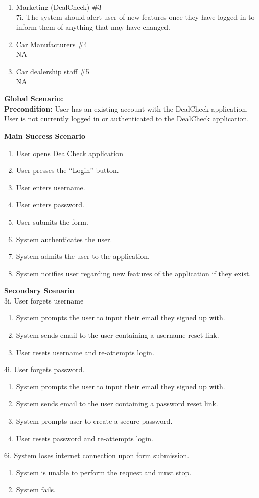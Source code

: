\documentclass[]{article}
\begin{document}
\begin{enumerate}
\begin{enumerate}[{\bf {BE}1.}]
\begin{enumerate}[{\bf VP1.}]
		\item Marketing (DealCheck) \#3 \\
			7i. The system should alert user of new features once they have logged in to inform them of anything that may have changed.
		\item Car Manufacturers \#4 \\
			NA
		\item Car dealership staff \#5 \\
			NA
	\end{enumerate}
	{\bf Global Scenario:}\\
	{\bf Precondition:} User has an existing account with the DealCheck application. User is not currently logged in or authenticated to the DealCheck application.

	{\bf Main Success Scenario}
		\begin{enumerate}[1.]
			\item User opens DealCheck application
			\item User presses the “Login” button.
			\item User enters username.
			\item User enters password.
			\item User submits the form.
			\item System authenticates the user.
			\item System admits the user to the application.
			\item System notifies user regarding new features of the application if they exist.
		\end{enumerate}
		{\bf Secondary Scenario} \\
		3i. User forgets username
		\begin{enumerate}[{3i}.1]
			\item System prompts the user to input their email they signed up with.
			\item System sends email to the user containing a username reset link.
			\item User resets username and re-attempts login.
		\end{enumerate}
		4i. User forgets password.
		\begin{enumerate}[{4i}.1]
			\item System prompts the user to input their email they signed up with.
			\item System sends email to the user containing a password reset link.
			\item System prompts user to create a secure password.
			\item User resets password and re-attempts login.
		\end{enumerate}
		6i. System loses internet connection upon form submission.
		\begin{enumerate}[{6i}.1]
			\item System is unable to perform the request and must stop.
			\item System fails.
		\end{enumerate}
\end{enumerate}


\end{enumerate}
\end{document}
